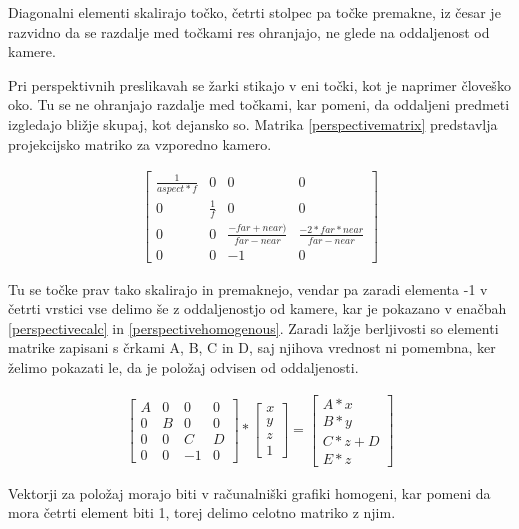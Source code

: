 \documentclass[a4paper, 12pt]{book}
\begin{document}
Diagonalni elementi skalirajo točko, četrti stolpec pa točke premakne, iz česar je razvidno da se razdalje med točkami res ohranjajo, ne glede na oddaljenost od kamere.

Pri perspektivnih preslikavah se žarki stikajo v eni točki, kot je naprimer človeško oko. Tu se ne ohranjajo razdalje med točkami, kar pomeni, da oddaljeni predmeti izgledajo bližje skupaj, kot dejansko so. Matrika \ref{perspectivematrix} predstavlja projekcijsko matriko za vzporedno kamero.

\begin{align}
\begin{bmatrix}
\frac{1}{aspect*f} & 0 & 0 & 0 \\ 
0 & \frac{1}{f} & 0 & 0 \\ 
0 & 0 & \frac{-far+near)}{far-near} & \frac{-2*far*near}{far-near} \\ 
0 & 0 & -1 & 0
\end{bmatrix}
\label{perspectivematrix}
\end{align}

Tu se točke prav tako skalirajo in premaknejo, vendar pa zaradi elementa -1 v četrti vrstici vse delimo še z oddaljenostjo od kamere, kar je pokazano v enačbah \ref{perspectivecalc} in \ref{perspectivehomogenous}. Zaradi lažje berljivosti so elementi matrike zapisani s črkami A, B, C in D, saj njihova vrednost ni pomembna, ker želimo pokazati le, da je položaj odvisen od oddaljenosti.

\begin{align}
\begin{bmatrix}
A & 0 & 0 & 0 \\ 
0 & B & 0 & 0 \\ 
0 & 0 & C & D \\ 
0 & 0 & -1 & 0
\end{bmatrix}
*
\begin{bmatrix}
x \\ y \\ z \\ 1
\end{bmatrix}	
=
\begin{bmatrix}
A*x \\
B*y \\
C*z+D \\
E*z
\end{bmatrix}
\label{perspectivecalc}
\end{align}

Vektorji za položaj morajo biti v računalniški grafiki homogeni, kar pomeni da mora četrti element biti 1, torej delimo celotno matriko z njim.
\end{document}
